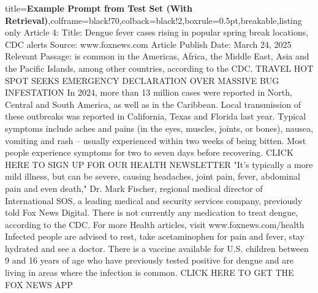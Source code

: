 \documentclass{article} %
\begin{document}
\begin{tcblisting}{title={\textbf{Example Prompt from Test Set (With Retrieval)}},colframe=black!70,colback=black!2,boxrule=0.5pt,breakable,listing only}
Article 4:
Title: Dengue fever cases rising in popular spring break locations, CDC alerts
Source: www.foxnews.com
Article Publish Date: March 24, 2025
Relevant Passage: is common in the Americas, Africa, the Middle East, Asia and the Pacific Islands, among other countries, according to the CDC. TRAVEL HOT SPOT SEEKS EMERGENCY DECLARATION OVER MASSIVE BUG INFESTATION In 2024, more than 13 million cases were reported in North, Central and South America, as well as in the Caribbean. Local transmission of these outbreaks was reported in California, Texas and Florida last year. Typical symptoms include aches and pains (in the eyes, muscles, joints, or bones), nausea, vomiting and rash  --  usually experienced within two weeks of being bitten. Most people experience symptoms for two to seven days before recovering. CLICK HERE TO SIGN UP FOR OUR HEALTH NEWSLETTER "It's typically a more mild illness, but can be severe, causing headaches, joint pain, fever, abdominal pain and even death," Dr. Mark Fischer, regional medical director of International SOS, a leading medical and security services company, previously told Fox News Digital. There is not currently any medication to treat dengue, according to the CDC. For more Health articles, visit www.foxnews.com/health Infected people are advised to rest, take acetaminophen for pain and fever, stay hydrated and see a doctor. There is a vaccine available for U.S. children between 9 and 16 years of age who have previously tested positive for dengue and are living in areas where the infection is common. CLICK HERE TO GET THE FOX NEWS APP


\end{tcblisting}
\end{document}
